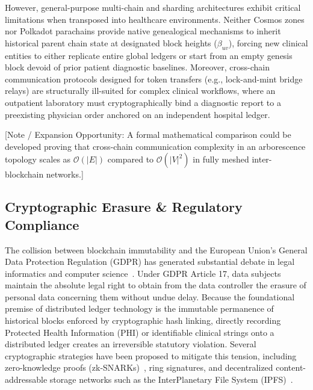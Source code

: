 However, general-purpose multi-chain and sharding architectures exhibit critical limitations when transposed into healthcare environments. Neither Cosmos zones nor Polkadot parachains provide native genealogical mechanisms to inherit historical parent chain state at designated block heights ($\beta_{uv}$), forcing new clinical entities to either replicate entire global ledgers or start from an empty genesis block devoid of prior patient diagnostic baselines. Moreover, cross-chain communication protocols designed for token transfers (e.g., lock-and-mint bridge relays) are structurally ill-suited for complex clinical workflows, where an outpatient laboratory must cryptographically bind a diagnostic report to a preexisting physician order anchored on an independent hospital ledger.

[Note / Expansion Opportunity: A formal mathematical comparison could be developed proving that cross-chain communication complexity in an arborescence topology scales as $\mathcal{O}(|E|)$ compared to $\mathcal{O}(|V|^2)$ in fully meshed inter-blockchain networks.]

\subsection{Cryptographic Erasure \& Regulatory Compliance}
The collision between blockchain immutability and the European Union's General Data Protection Regulation (GDPR) has generated substantial debate in legal informatics and computer science~\cite{politou2018forgetting, finck2018blockchain}. Under GDPR Article 17, data subjects maintain the absolute legal right to obtain from the data controller the erasure of personal data concerning them without undue delay. Because the foundational premise of distributed ledger technology is the immutable permanence of historical blocks enforced by cryptographic hash linking, directly recording Protected Health Information (PHI) or identifiable clinical strings onto a distributed ledger creates an irreversible statutory violation. Several cryptographic strategies have been proposed to mitigate this tension, including zero-knowledge proofs (zk-SNARKs)~\cite{sasson2014zerocash}, ring signatures, and decentralized content-addressable storage networks such as the InterPlanetary File System (IPFS)~\cite{benet2014ipfs}. 

